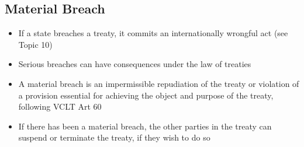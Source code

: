\subsection{Material Breach}
\begin{itemize}
    \item If a state breaches a treaty, it commits an internationally wrongful act (see Topic 10)
    \item Serious breaches can have consequences under the law of treaties
    \item A material breach is an impermissible repudiation of the treaty or violation of a provision essential for achieving the object and purpose of the treaty, following VCLT Art 60
    \item If there has been a material breach, the other parties in the treaty can suspend or terminate the treaty, if they wish to do so
\end{itemize}
